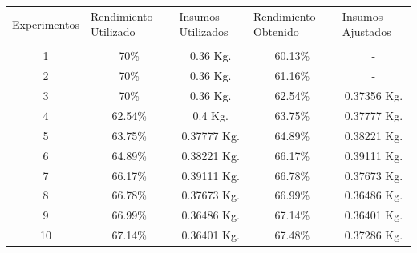     \begin{minipage}{0.95\textwidth}    
    
        \centering
        \begin{tabularx}{\textwidth}{|X|X|X|X|X|}
             \hline
             \multicolumn{1}{|c|}{Experimentos} & \multirow{1}{2cm}{Rendimiento Utilizado} &\multirow{1}{2cm}{Insumos Utilizados}  & \multirow{1}{2cm}{Rendimiento Obtenido} &\multirow{1}{2cm}{Insumos Ajustados}\\
             & & & &\\
             \hline
             \hline
             \multicolumn{1}{|c|}{1} & \multicolumn{1}{c|}{70\%} & \multicolumn{1}{c|}{0.36 Kg.} &\multicolumn{1}{c|}{60.13\%} &\multicolumn{1}{c|}{-} \\
             \hline
             \multicolumn{1}{|c|}{2} & \multicolumn{1}{c|}{70\%}  & \multicolumn{1}{c|}{0.36 Kg.} &\multicolumn{1}{c|}{61.16\%} &\multicolumn{1}{c|}{-} \\
             \hline
             \multicolumn{1}{|c|}{3} & \multicolumn{1}{c|}{70\%} & \multicolumn{1}{c|}{0.36 Kg.} &\multicolumn{1}{c|}{62.54\%} &\multicolumn{1}{c|}{0.37356 Kg.} \\
             \hline
             \multicolumn{1}{|c|}{4} & \multicolumn{1}{c|}{62.54\%}  & \multicolumn{1}{c|}{0.4 Kg.} &\multicolumn{1}{c|}{63.75\%} &\multicolumn{1}{c|}{0.37777 Kg.} \\
             \hline
             \multicolumn{1}{|c|}{5} & \multicolumn{1}{c|}{63.75\%}  & \multicolumn{1}{c|}{0.37777 Kg.} &\multicolumn{1}{c|}{64.89\%} &\multicolumn{1}{c|}{0.38221 Kg.} \\
             \hline
             \multicolumn{1}{|c|}{6} & \multicolumn{1}{c|}{64.89\%}  & \multicolumn{1}{c|}{0.38221 Kg.} &\multicolumn{1}{c|}{66.17\%} &\multicolumn{1}{c|}{0.39111 Kg.} \\
             \hline
             \multicolumn{1}{|c|}{7} & \multicolumn{1}{c|}{66.17\%}  & \multicolumn{1}{c|}{0.39111 Kg.} &\multicolumn{1}{c|}{66.78\%} &\multicolumn{1}{c|}{0.37673 Kg.} \\
             \hline
             \multicolumn{1}{|c|}{8} & \multicolumn{1}{c|}{66.78\%}  & \multicolumn{1}{c|}{0.37673 Kg.} &\multicolumn{1}{c|}{66.99\%} &\multicolumn{1}{c|}{0.36486 Kg.} \\
             \hline
             \multicolumn{1}{|c|}{9} & \multicolumn{1}{c|}{66.99\%}  & \multicolumn{1}{c|}{0.36486 Kg.} &\multicolumn{1}{c|}{67.14\%} &\multicolumn{1}{c|}{0.36401 Kg.} \\
             \hline
             \multicolumn{1}{|c|}{10} & \multicolumn{1}{c|}{67.14\%} & \multicolumn{1}{c|}{0.36401 Kg.} &\multicolumn{1}{c|}{67.48\%} &\multicolumn{1}{c|}{0.37286 Kg.} \\
             \hline
        \end{tabularx}
        \label{tab:ResultadosPilsenSimple}
    \end{minipage}
    
